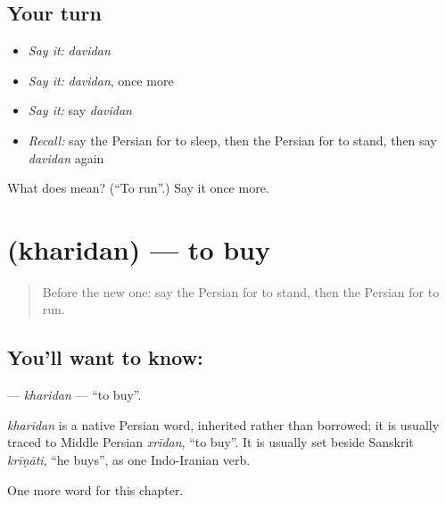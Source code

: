 \subsection*{Your turn}
\begin{itemize}
\raggedright
  \item \emph{Say it:} \emph{davidan}
  \item \emph{Say it:} \emph{davidan}, once more
  \item \emph{Say it:} say \emph{davidan}
  \item \emph{Recall:} say the Persian for to sleep, then the Persian for to stand, then say \emph{davidan} again
\end{itemize}

\begin{tcolorbox}[breakable,colback=teal!4,colframe=teal!35!black,title={Before you move on}]
What does  mean? (\textquotedblleft{}To run\textquotedblright{}.) Say it once more.
\end{tcolorbox}
\section[\texorpdfstring{\fa{خریدن} (kharidan)}{خریدن (kharidan)}]{ (kharidan) — to buy}

\label{lesson:FA-C36-kharidan}



\begin{quote}
Before the new one: say the Persian for to stand, then the Persian for to run.
\end{quote}

\subsection*{You'll want to know: }
\textbf{} — \emph{kharidan} — \textquotedblleft{}to buy\textquotedblright{}.

\begin{cousinweb}
\emph{kharidan} is a native Persian word, inherited rather than borrowed; it is usually traced to Middle Persian \emph{xrīdan}, \textquotedblleft{}to buy\textquotedblright{}. It is usually set beside Sanskrit \emph{krīṇāti}, \textquotedblleft{}he buys\textquotedblright{}, as one Indo-Iranian verb.
\end{cousinweb}

\begin{grammarlens}[title={What you've built}]
One more word for this chapter.
\end{grammarlens}

